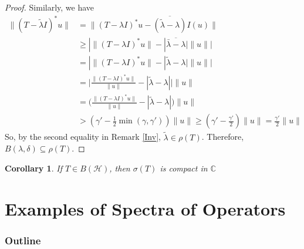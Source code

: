 \documentclass{beamer}
\newtheorem{cor}{Corollary}
\begin{document}
  \begin{frame}{\subsecname}
    \begin{proof}
      Similarly, we have
      $$
      \begin{aligned}
        \lVert(T-\tilde{\lambda}I)^{*}u\rVert&=\lVert(T-\lambda I)^{*}u-\overline{(\tilde{\lambda}-\lambda)}I(u)\rVert\\&\geq|\lVert(T-\lambda I)^{*}u\rVert-|\overline{\bar{\lambda}-\lambda}|\lVert u\rVert| \\
                                                                                                                     &=|\lVert(T-\lambda I)^{*}u\rVert-|\tilde{\lambda}-\lambda|\lVert u\rVert| \\
                                                                                                                     &=\Big|\frac{\lVert(T-\lambda I)^{*}u\rVert}{\lVert u\rVert}-|\tilde{\lambda}-\lambda|\Big|\lVert u\rVert \\
                                                                                                                     &=\Big(\frac{\lVert(T-\lambda I)^{*}u\rVert}{\lVert u\rVert}-|\tilde{\lambda}-\lambda|\Big)\lVert u\rVert \\
                                                                                                                     &>(\gamma'-\frac{1}{2}\min(\gamma,\gamma'))\lVert u\rVert 
                                                                                                                     \geq(\gamma'-\frac{\gamma'}{2})\lVert u\rVert 
                                                                                                                     =\frac{\gamma'}{2}\lVert u\rVert
      \end{aligned}
      $$
      So, by the second equality in Remark \ref{Inv}, $\tilde{\lambda}\in\rho(T)$. Therefore, $B(\lambda,\delta)\subseteq\rho(T)$.
    \end{proof}
  \end{frame}

  \begin{frame}{\subsecname}
    \begin{cor}
      If $T\in B(\mathcal{H})$, then $\sigma(T)$ is compact in $\mathbb{C}$
    \end{cor}
  \end{frame}

  \section{Examples of Spectra of Operators}
  \begin{frame}
    \frametitle{Outline}
    \tableofcontents[current]
  \end{frame}
\end{document}
